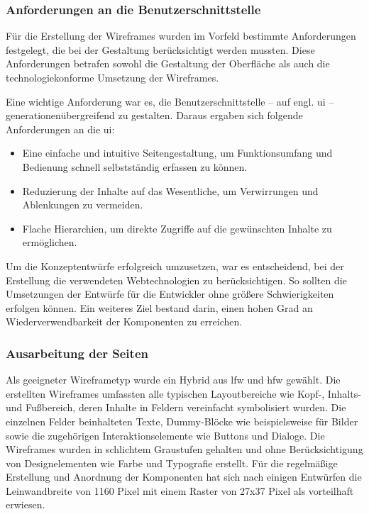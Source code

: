 \subsubsection{Anforderungen an die Benutzerschnittstelle}

Für die Erstellung der Wireframes wurden im Vorfeld bestimmte Anforderungen festgelegt, die bei der Gestaltung berücksichtigt werden mussten. Diese Anforderungen betrafen sowohl die Gestaltung der Oberfläche als auch die technologiekonforme Umsetzung der Wireframes.

Eine wichtige Anforderung war es, die Benutzerschnittstelle -- auf engl. \acrfull{ui} -- generationenübergreifend zu gestalten. Daraus ergaben sich folgende Anforderungen an die \acrshort{ui}:

\begin{itemize}
    \item Eine einfache und intuitive Seitengestaltung, um Funktionsumfang und Bedienung schnell selbstständig erfassen zu können.
    \item Reduzierung der Inhalte auf das Wesentliche, um Verwirrungen und Ablenkungen zu vermeiden.
    \item Flache Hierarchien, um direkte Zugriffe auf die gewünschten Inhalte zu ermöglichen.
\end{itemize}

Um die Konzeptentwürfe erfolgreich umzusetzen, war es entscheidend, bei der Erstellung die verwendeten Webtechnologien zu berücksichtigen. So sollten die Umsetzungen der Entwürfe für die Entwickler ohne größere Schwierigkeiten erfolgen können. Ein weiteres Ziel bestand darin, einen hohen Grad an Wiederverwendbarkeit der Komponenten zu erreichen.

\subsubsection{Ausarbeitung der Seiten}

Als geeigneter Wireframetyp wurde ein Hybrid aus \acrshort{lfw} und \acrshort{hfw} gewählt. Die erstellten Wireframes umfassten alle typischen Layoutbereiche wie Kopf-, Inhalts- und Fußbereich, deren Inhalte in Feldern vereinfacht symbolisiert wurden. Die einzelnen Felder beinhalteten Texte, Dummy-Blöcke wie beispielsweise für Bilder sowie die zugehörigen Interaktionselemente wie Buttons und Dialoge.
Die Wireframes wurden in schlichtem Graustufen gehalten und ohne Berücksichtigung von Designelementen wie Farbe und Typografie erstellt. Für die regelmäßige Erstellung und Anordnung der Komponenten hat sich nach einigen Entwürfen die Leinwandbreite von 1160 Pixel mit einem Raster von 27x37 Pixel als vorteilhaft erwiesen.


